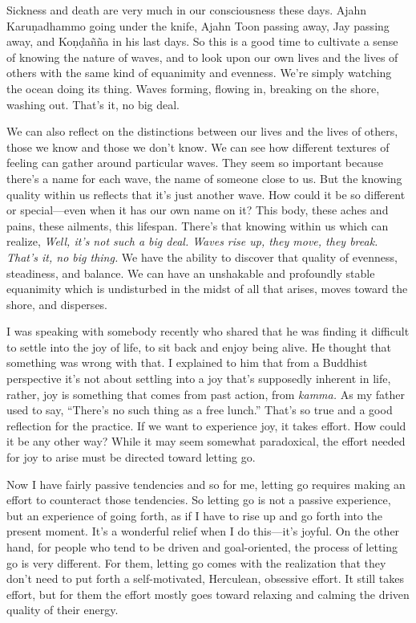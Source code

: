 Sickness and death are very much in our consciousness these days. Ajahn 
Karuṇadhammo going under the knife, Ajahn Toon passing away, Jay 
passing away, and Koṇḍañña in his last days. So this is a good 
time to cultivate a sense of knowing the nature of waves, and to look 
upon our own lives and the lives of others with the same kind of 
equanimity and evenness. We're simply watching the ocean doing its 
thing. Waves forming, flowing in, breaking on the shore, washing out. 
That's it, no big deal.

We can also reflect on the distinctions between our lives and the lives 
of others, those we know and those we don't know. We can see how 
different textures of feeling can gather around particular waves. They 
seem so important because there's a name for each wave, the name of 
someone close to us. But the knowing quality within us reflects that 
it's just another wave. How could it be so different or special---even 
when it has our own name on it? This body, these aches and pains, these 
ailments, this lifespan. There's that knowing within us which can 
realize, \emph{Well, it's not such a big deal. Waves rise up, they 
move, they break. That's it, no big thing.} We have the ability to 
discover that quality of evenness, steadiness, and balance. We can have 
an unshakable and profoundly stable equanimity which is undisturbed in 
the midst of all that arises, moves toward the shore, and disperses.


I was speaking with somebody recently who shared that he was finding it 
difficult to settle into the joy of life, to sit back and enjoy being 
alive. He thought that something was wrong with that. I explained to 
him that from a Buddhist perspective it's not about settling into a joy 
that's supposedly inherent in life, rather, joy is something that comes 
from past action, from \emph{kamma.} As my father used to say, 
``There's no such thing as a free lunch.'' That's so true and a good 
reflection for the practice. If we want to experience joy, it takes 
effort. How could it be any other way? While it may seem somewhat 
paradoxical, the effort needed for joy to arise must be directed toward 
letting go.

Now I have fairly passive tendencies and so for me, letting go requires 
making an effort to counteract those tendencies. So letting go is not a 
passive experience, but an experience of going forth, as if I have to 
rise up and go forth into the present moment. It's a wonderful relief 
when I do this---it's joyful. On the other hand, for people who tend to 
be driven and goal-oriented, the process of letting go is very 
different. For them, letting go comes with the realization that they 
don't need to put forth a self-motivated, Herculean, obsessive effort. 
It still takes effort, but for them the effort mostly goes toward 
relaxing and calming the driven quality of their energy.

